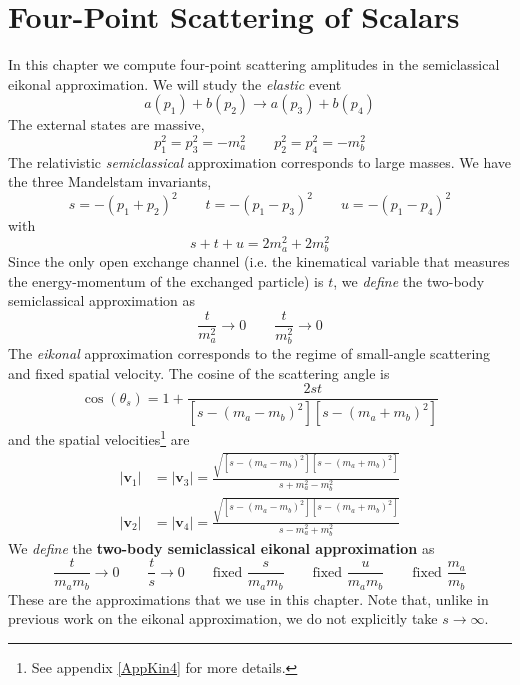 \chapter{Four-Point Scattering of Scalars\label{Ch4Sca}}
In this chapter we compute four-point scattering amplitudes in the semiclassical eikonal approximation. We will study the \textit{elastic} event
\begin{equation}
	a(p_{1}) + b(p_{2}) \longrightarrow a(p_{3}) + b(p_{4})
\end{equation}
The external states are massive,
\begin{equation}
	p_{1}^{2} = p_{3}^{2} = -m_{a}^{2} \qquad p_{2}^{2} = p_{4}^{2} = -m_{b}^{2}
\end{equation}
The relativistic \textit{semiclassical} approximation corresponds to large masses. We have the three Mandelstam invariants,
\begin{equation}
	s = -(p_{1} + p_{2})^{2} \qquad t = -(p_{1} - p_{3})^{2} \qquad u = -(p_{1} - p_{4})^{2}
\end{equation}
with
\begin{equation}
	s + t + u = 2m_{a}^{2} + 2m_{b}^{2}
\end{equation}
Since the only open exchange channel (i.e. the kinematical variable that measures the energy-momentum of the exchanged particle) is $t$, we \textit{define} the two-body semiclassical approximation as
\begin{equation}
 	\frac{t}{m_{a}^{2}} \rightarrow 0 \qquad \frac{t}{m_{b}^{2}} \rightarrow 0
\end{equation}
The \textit{eikonal} approximation corresponds to the regime of small-angle scattering and fixed spatial velocity. The cosine of the scattering angle is
\begin{equation}
	\cos{(\theta_{s})} = 1 + \frac{2 s t}{[s - (m_{a} - m_{b})^{2}][s - (m_{a} + m_{b})^{2}]}
\end{equation}
and the spatial velocities\footnote{See appendix \ref{AppKin4} for more details.} are
\begin{align}
	|\mathbf{v}_{1}| &= |\mathbf{v}_{3}| = \frac{\sqrt{[s - (m_{a} - m_{b})^{2}] [s - (m_{a} + m_{b})^{2}]}}{s + m_{a}^{2} - m_{b}^{2}} \\
	|\mathbf{v}_{2}| &= |\mathbf{v}_{4}| = \frac{\sqrt{[s - (m_{a} - m_{b})^{2}] [s - (m_{a} + m_{b})^{2}]}}{s - m_{a}^{2} + m_{b}^{2}}
\end{align}
We \textit{define} the \textbf{two-body semiclassical eikonal approximation} as
\begin{equation}
	\frac{t}{m_{a} m_{b}} \rightarrow 0 \qquad \frac{t}{s} \rightarrow 0 \qquad \text{fixed } \frac{s}{m_{a} m_{b}} \qquad \text{fixed } \frac{u}{m_{a} m_{b}} \qquad \text{fixed } \frac{m_{a}}{m_{b}} \label{2BodyEikonalJWKB}
\end{equation}
These are the approximations that we use in this chapter. Note that, unlike in previous work on the eikonal approximation, we do not explicitly take $s \rightarrow \infty$.

